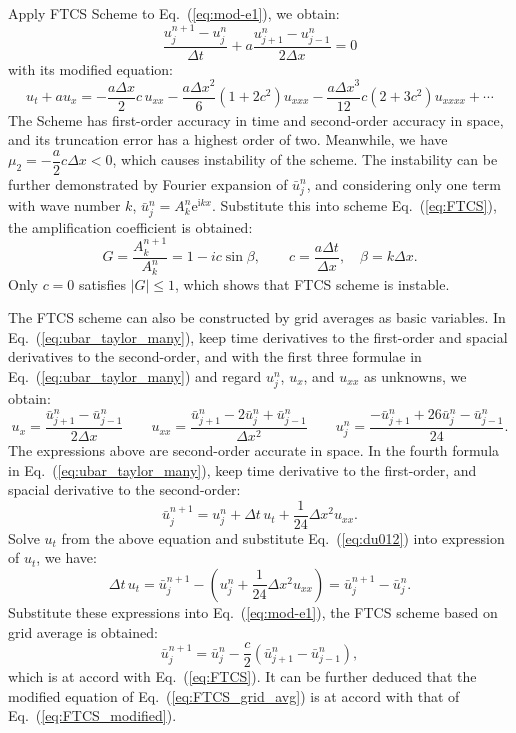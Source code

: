 \documentclass[]{article}
\newcommand{\me}{\mathrm{e}}
\newcommand{\mi}{\mathrm{i}}
\begin{document}
Apply FTCS Scheme to Eq.~(\ref{eq:mod-e1}), we obtain:
\begin{equation}
  \dfrac{u_j^{n+1}-u_j^n}{\Delta t}+a\dfrac{u_{j+1}^n-u_{j-1}^n}{2\Delta x}=0
  \label{eq:FTCS}
\end{equation}
with its modified equation:
\begin{equation}
  u_t+au_x=-\dfrac{a\Delta x}{2}c\, u_{xx}-\dfrac{a\Delta x^2}{6}(1+2c^2)u_{xxx} -\dfrac{a\Delta x^3}{12}c(2+3c^2)u_{xxxx}+\cdots
  \label{eq:FTCS_modified}
\end{equation}
The Scheme has first-order accuracy in time and second-order accuracy
in space, and its truncation error has a highest order of
two. Meanwhile, we have $\mu_2 = -\dfrac{a}{2}c\Delta x<0$, which
causes instability of the scheme. The instability can be further
demonstrated by Fourier expansion of $\bar u_j^n$, and considering
only one term with wave number $k$, $\bar u_j^n=A_k^n\me^{\mi
  kx}$. Substitute this into scheme Eq.~(\ref{eq:FTCS}), the amplification
coefficient is obtained:
\begin{equation}
  G=\frac{A_k^{n+1}}{A_k^n}=1-ic\sin \beta,
  \qquad
  c=\frac{a\Delta t}{\Delta x},\quad \beta=k\Delta x.
  \label{eq:FTCSG} 
\end{equation}
Only $c=0$ satisfies $|G|\leq 1$, which shows that FTCS scheme is
instable.

The FTCS scheme can also be constructed by grid averages as basic
variables. In Eq.~(\ref{eq:ubar_taylor_many}), keep time derivatives
to the first-order and spacial derivatives to the second-order, and
with the first three formulae in Eq.~(\ref{eq:ubar_taylor_many}) and
regard $u_j^n$, $u_x$, and $u_{xx}$ as unknowns, we obtain:
\begin{equation}
  u_x = \frac{\bar u_{j+1}^n-\bar u_{j-1}^n}{2\Delta x} \qquad
  u_{xx} = \frac{\bar u_{j+1}^n-2\bar u_j^n+\bar u_{j-1}^n}{\Delta x^2} \qquad
  u_j^n = \frac{-\bar u_{j+1}^n + 26\bar u_j^n - \bar u_{j-1}^n}{24}.
  \label{eq:du012}
\end{equation}
The expressions above are second-order accurate in space. In the
fourth formula in Eq.~(\ref{eq:ubar_taylor_many}), keep time
derivative to the first-order, and spacial derivative to the 
second-order:
\[
\bar u_{j}^{n+1} = u_j^n+\Delta t\, u_t + \frac{1}{24} \Delta x^2 u_{xx}.
\]
Solve $u_t$ from the above equation and substitute
Eq.~(\ref{eq:du012}) into expression of $u_t$, we have:
\[
\Delta t\, u_t =  \bar u_j^{n+1}-\left(u_j^n +\frac{1}{24} \Delta x^2
u_{xx}\right) = \bar u_j^{n+1}- \bar u_{j}^n.
\]
Substitute these expressions into Eq.~(\ref{eq:mod-e1}), the FTCS
scheme based on grid average is obtained:
\begin{equation}
  \bar u_j^{n+1} = \bar u_j^n - \frac{c}{2} \left(\bar u_{j+1}^n-\bar u_{j-1}^n\right),
  \label{eq:FTCS_grid_avg}
\end{equation}
which is at accord with Eq.~(\ref{eq:FTCS}). It can be further deduced
that the modified equation of Eq.~(\ref{eq:FTCS_grid_avg}) is at
accord with that of Eq.~(\ref{eq:FTCS_modified}).
\end{document}
